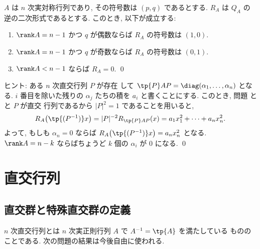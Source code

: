 \documentclass[12pt,twoside]{jarticle}
\begin{document}

\begin{question}
\label{q:inv-q-form-4}
  $A$ は $n$ 次実対称行列であり, その符号数は $(p,q)$ であるとする.
  $R_A$ は $Q_A$ の逆の二次形式であるとする. このとき, 以下が成立する:
  \begin{enumerate}
  \item $\rank A = n-1$ かつ $q$ が偶数ならば $R_A$ の符号数は $(1,0)$.
  \item $\rank A = n-1$ かつ $q$ が奇数ならば $R_A$ の符号数は $(0,1)$.
  \item $\rank A < n-1$ ならば $R_A=0$.
    \qed
  \end{enumerate}
\end{question}

\noindent
ヒント: ある $n$ 次直交行列 $P$ が存在
して $\tp{P}AP = \diag(\alpha_1,\dots,\alpha_n)$ となる. 
$i$ 番目を除いた残りの $\alpha_j$ たちの積を $a_i$ と書くことにする.
このとき, 問題  と  と $P$ が直交
行列であるから $|P|^2=1$ であることを用いると,
\begin{equation*}
  R_A\bigl(\tp{(P^{-1})}x\bigr)
  = |P|^{-2} R_{\tp{P}AP}(x)
  = a_1 x_1^2 + \cdots + a_n x_n^2.
\end{equation*}
よって, もしも $\alpha_n=0$ 
ならば $R_A\bigl(\tp{(P^{-1})}x\bigr) = a_n x_n^2$ となる.
$\rank A = n-k$ ならばちょうど $k$ 個の $\alpha_i$ が $0$ になる.
\qed


\section{直交行列}
\label{sec:orthogonal}


\subsection{直交群と特殊直交群の定義}
\label{sec:def-O(n)-SO(n)}

$n$ 次直交行列とは $n$ 次実正則行列 $A$ で $A^{-1}=\tp{A}$ を満たしている
もののことである.  次の問題の結果は今後自由に使われる.
\end{document}
